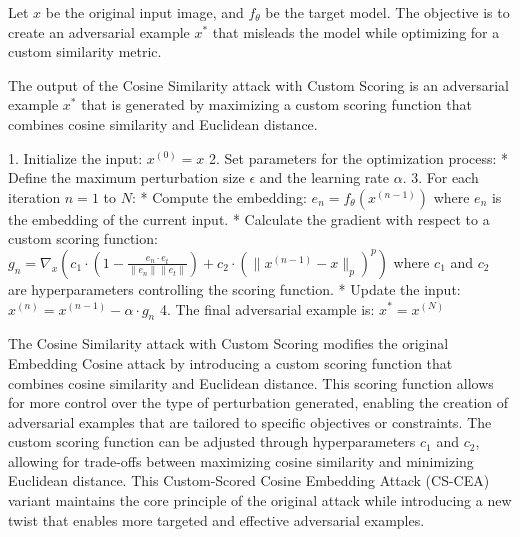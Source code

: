 Let $x$ be the original input image, and $f_{\theta}$ be the target model. The objective is to create an adversarial example $x^*$ that misleads the model while optimizing for a custom similarity metric.

The output of the Cosine Similarity attack with Custom Scoring is an adversarial example $x^*$ that is generated by maximizing a custom scoring function that combines cosine similarity and Euclidean distance.

1. Initialize the input:
$x^{(0)} = x$
2. Set parameters for the optimization process:
	* Define the maximum perturbation size $\epsilon$ and the learning rate $\alpha$.
3. For each iteration $n = 1$ to $N$:
	* Compute the embedding:
    $e_n = f_{\theta}(x^{(n-1)})$
    where $e_n$ is the embedding of the current input.
	* Calculate the gradient with respect to a custom scoring function:
    $g_n = \nabla_x (c_1 \cdot (1 - \frac{e_n \cdot e_t}{\|e_n\| \|e_t\|}) + c_2 \cdot (\|x^{(n-1)} - x\|_p)^p)$
    where $c_1$ and $c_2$ are hyperparameters controlling the scoring function.
	* Update the input:
    $x^{(n)} = x^{(n-1)} - \alpha \cdot g_n$
4. The final adversarial example is:
    $x^* = x^{(N)}$

The Cosine Similarity attack with Custom Scoring modifies the original Embedding Cosine attack by introducing a custom scoring function that combines cosine similarity and Euclidean distance. This scoring function allows for more control over the type of perturbation generated, enabling the creation of adversarial examples that are tailored to specific objectives or constraints. The custom scoring function can be adjusted through hyperparameters $c_1$ and $c_2$, allowing for trade-offs between maximizing cosine similarity and minimizing Euclidean distance. This Custom-Scored Cosine Embedding Attack (CS-CEA) variant maintains the core principle of the original attack while introducing a new twist that enables more targeted and effective adversarial examples.